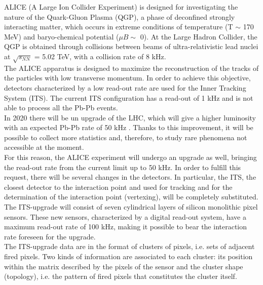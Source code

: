 \newenvironment{abstract}%
    {\cleardoublepage%
    \begin{center}%
      \bfseries\huge\abstractname
    \end{center}}%
    {\vfill\null}
    \onehalfspacing
      \begin{abstract}
	ALICE (A Large Ion Collider Experiment) is designed for investigating the nature of the Quark-Gluon Plasma (QGP), a phase of deconfined strongly interacting matter, which occurs in extreme conditions of temperature (T $\sim$ 170 MeV) and baryo-chemical potential ($\mu B \sim$ 0).
	At the Large Hadron Collider, the QGP is obtained through collisions between beams of ultra-relativistic lead nuclei at $\sqrt{s_{NN}}$ = 5.02 TeV, with a collision rate of 8 kHz.\\
	The ALICE apparatus is designed to maximize the reconstruction of the tracks of the particles with low transverse momentum. In order to achieve this objective, detectors characterized by a low read-out rate are used for the Inner Tracking System (ITS). The current ITS configuration has a read-out of 1 kHz and  is not able to process all the Pb-Pb events.\\
	In 2020 there will be un upgrade of the LHC, which will give a higher luminosity with an expected Pb-Pb rate of 50 kHz . Thanks to this improvement, it will be possible to collect more statistics and, therefore, to study rare phenomena not accessible at the moment.\\
	For this reason, the ALICE experiment will undergo an upgrade as well, bringing the read-out rate from the current limit up to 50 kHz. In order to fulfill this request, there will be several changes in the detectors. In particular, the ITS, the closest detector to the interaction point and used for tracking and for the determination of the interaction point (vertexing), will be completely substituted.\\
	The ITS-upgrade will consist of seven cylindrical layers of silicon monolithic pixel sensors. These new sensors, characterized by a digital read-out system, have a maximum read-out rate of 100 kHz, making it possible to bear the interaction rate foreseen for the upgrade.\\
	The ITS-upgrade data are in the format of clusters of pixels, i.e. sets of adjacent fired pixels. Two kinds of information are associated to each cluster: its position within the matrix described by the pixels of the sensor and the cluster shape (topology), i.e. the pattern of fired pixels that constitutes the cluster itself.\\

\end{abstract}

